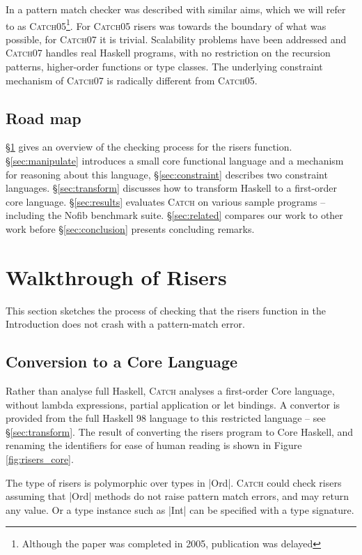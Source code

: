 \documentclass[preprint]{sigplanconf}
\newcommand{\C}[1]{\textsf{#1}}
\newcommand{\catch}{\textsc{Catch}}
\begin{document}
In \citet{me:catch_tfp} a pattern match checker was described with similar aims, which we will refer to as \catch05\footnote{Although the paper was completed in 2005, publication was delayed}. For \catch05 \C{risers} was towards the boundary of what was possible, for \catch07 it is trivial. Scalability problems have been addressed and \catch07 handles real Haskell programs, with no restriction on the recursion patterns, higher-order functions or type classes. The underlying constraint mechanism of \catch07 is radically different from \catch05.

\subsection{Road map}

\S\ref{sec:walkthrough} gives an overview of the checking process for the \C{risers} function. \S\ref{sec:manipulate} introduces a small core functional language and a mechanism for reasoning about this language, \S\ref{sec:constraint} describes two constraint languages. \S\ref{sec:transform} discusses how to transform Haskell to a first-order core language. \S\ref{sec:results} evaluates \catch{} on various sample programs -- including the Nofib benchmark suite. \S\ref{sec:related} compares our work to other work before \S\ref{sec:conclusion} presents concluding remarks.

\section{Walkthrough of Risers}
\label{sec:walkthrough}

This section sketches the process of checking that the \C{risers} function in the Introduction does not crash with a pattern-match error.


\subsection{Conversion to a Core Language}

Rather than analyse full Haskell, \catch{} analyses a first-order Core language, without lambda expressions, partial application or let bindings. A convertor is provided from the full Haskell 98 language to this restricted language -- see \S\ref{sec:transform}. The result of converting the \C{risers} program to Core Haskell, and renaming the identifiers for ease of human reading is shown in Figure \ref{fig:risers_core}.

The type of \C{risers} is polymorphic over types in |Ord|. \catch{} could check \C{risers} assuming that |Ord| methods do not raise pattern match errors, and may return any value. Or a type instance such as |Int| can be specified with a type signature.
\end{document}
